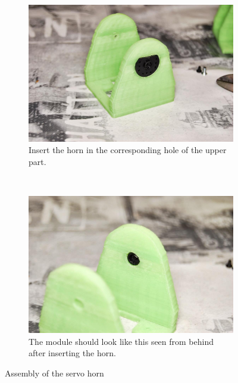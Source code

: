 \begin{figure}[H]
\begin{subfigure}[b]{0.46\textwidth}
                \label{fig:hardware_assembly_11}
        \end{subfigure}
        ~
        \begin{subfigure}[b]{0.46\textwidth}
                \centering
                \includegraphics[width=\textwidth]{images/REPY2_assembly_12.jpg}
                \caption{Insert the horn in the corresponding hole of the upper part.\\ }
                \label{fig:hardware_assembly_12}
        \end{subfigure}
        ~
        \begin{subfigure}[b]{0.46\textwidth}
                \centering
                \includegraphics[width=\textwidth]{images/REPY2_assembly_13.jpg}
                \caption{The module should look like this seen from behind after inserting the horn.\\}
                \label{fig:hardware_assembly_13}
        \end{subfigure}
        \caption{Assembly of the servo horn} 
        \label{fig:hardware_assembly_horn}
\end{figure}

